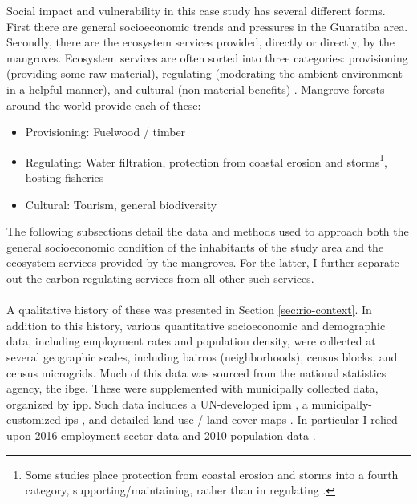 Social impact and vulnerability in this case study has several different forms. First there are general socioeconomic trends and pressures in the Guaratiba area. Secondly, there are the ecosystem services provided, directly or directly, by the mangroves. Ecosystem services are often sorted into three categories: provisioning (providing some raw material), regulating (moderating the ambient environment in a helpful manner), and cultural (non-material benefits) \cite{haines-youngCommonInternationalClassification2018}. Mangrove forests around the world provide each of these:

\begin{itemize}[itemsep=0pt,parsep=0pt]
	\item{Provisioning: Fuelwood / timber}
	\item{Regulating: Water filtration, protection from coastal erosion and storms\footnote{Some studies place protection from coastal erosion and storms into a fourth category, supporting/maintaining, rather than in regulating \cite{getznerEcosystemServicesMangrove2020}.}, hosting fisheries}
	\item{Cultural: Tourism, general biodiversity}
\end{itemize}

The following subsections detail the data and methods used to approach both the general socioeconomic condition of the inhabitants of the study area and the ecosystem services provided by the mangroves. For the latter, I further separate out the carbon regulating services from all other such services.

\paragraph{} \leavevmode\newline

A qualitative history of these was presented in Section \ref{sec:rio-context}. In addition to this history, various quantitative socioeconomic and demographic data, including employment rates and population density, were collected at several geographic scales, including bairros (neighborhoods), census blocks, and census microgrids. Much of this data was sourced from the national statistics agency, the \ac{ibge}. These were supplemented with municipally collected data, organized by \ac{ipp}. Such data includes a UN-developed \ac{ipm} \cite{oxfordpovertyandhumandevelopmentinitiativeChartingPathewaysOut2020}, a municipally-customized \ac{ips} \cite{puliciRelatorioMetodologicoIndice2016}, and detailed land use / land cover maps \cite{regoAutomaticClassificationLand2003}. In particular I relied upon 2016 employment sector data \cite{institutopereirapassosNumeroEmpregadosPor2018} and 2010 population data \cite{institutopereirapassosPopulacaoResidentePor2018}.

